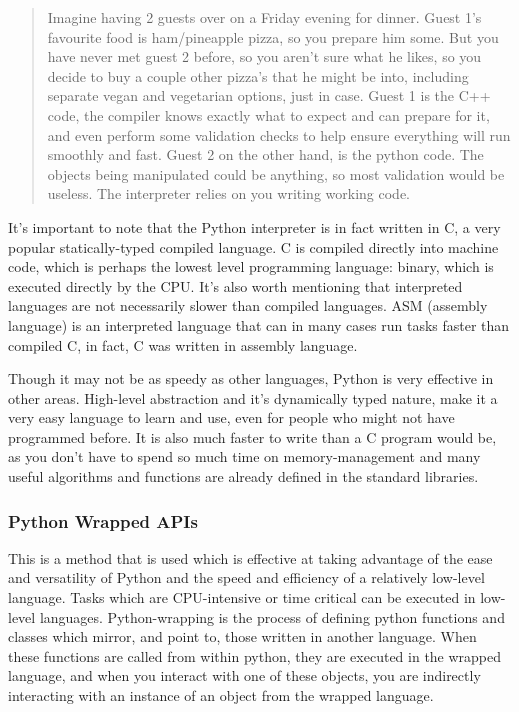 \begin{quote}
Imagine having 2 guests over on a Friday evening for dinner. Guest 1's favourite food is ham/pineapple pizza, so you prepare him some. But you have never met guest 2 before, so you aren't sure what he likes, so you decide to buy a couple other pizza's that he might be into, including separate vegan and vegetarian options, just in case. Guest 1 is the C++ code, the compiler knows exactly what to expect and can prepare for it, and even perform some validation checks to help ensure everything will run smoothly and fast. Guest 2 on the other hand, is the python code. The objects being manipulated could be anything, so most validation would be useless. The interpreter relies on you writing working code.
\end{quote}

It's important to note that the Python interpreter is in fact written in C, a very popular statically-typed compiled language. C is compiled directly into machine code, which is perhaps the lowest level programming language: binary, which is executed directly by the CPU. It's also worth mentioning that interpreted languages are not necessarily slower than compiled languages. ASM (assembly language) is an interpreted language that can in many cases run tasks faster than compiled C, in fact, C was written in assembly language.

Though it may not be as speedy as other languages, Python is very effective in other areas. High-level abstraction and it's dynamically typed nature, make it a very easy language to learn and use, even for people who might not have programmed before. It is also much faster to write than a C program would be, as you don't have to spend so much time on memory-management and many useful algorithms and functions are already defined in the standard libraries.

\hypertarget{python-wrapped-apis}{%
\subsubsection{Python Wrapped APIs}\label{python-wrapped-apis}}

This is a method that is used which is effective at taking advantage of the ease and versatility of Python and the speed and efficiency of a relatively low-level language. Tasks which are CPU-intensive or time critical can be executed in low-level languages. Python-wrapping is the process of defining python functions and classes which mirror, and point to, those written in another language. When these functions are called from within python, they are executed in the wrapped language, and when you interact with one of these objects, you are indirectly interacting with an instance of an object from the wrapped language.

